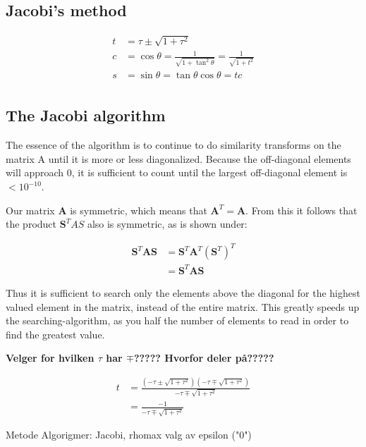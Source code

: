 \subsection{Jacobi's method}

\begin{align*}
t &= \tau \pm \sqrt{1+\tau^2}\\ 
c &= \cos \theta = \frac{1}{\sqrt{1+\tan^2\theta}} = \frac{1}{\sqrt{1+t^2}}\\
s &= \sin \theta = \tan \theta \cos \theta = t c\\
\end{align*}

\subsection{The Jacobi algorithm}

The essence of the algorithm is to continue to do similarity transforms on the matrix A until it is more or less diagonalized. Because the off-diagonal elements will approach $ 0 $, it is sufficient to count until the largest off-diagonal element is $ < 10^{-10} $. 

Our matrix \textbf{A} is symmetric, which means that $ \textbf{A}^T = \textbf{A} $. From this it follows that the product $ \textbf{S}^TAS $ also is symmetric, as is shown under:

\begin{align}
\textbf{S}^T\textbf{AS} &= \textbf{S}^T\textbf{A}^T(\textbf{S}^T)^T\\
&= \textbf{S}^T\textbf{AS} 
\end{align}

Thus  it is sufficient to search only the elements above the diagonal for the highest valued element in the matrix, instead of the entire matrix. This greatly speeds up the searching-algorithm, as you half the number of elements to read in order to find the greatest value. 



\textbf{Velger for hvilken $ \tau $ har $ \mp $?????
Hvorfor deler på?????
}

\begin{align}
t &= \frac{(-\tau \pm \sqrt{1+\tau^2})(-\tau \mp \sqrt{1+ \tau^2})}{-\tau \mp \sqrt{1+\tau^2}}\\
&= \frac{-1}{-\tau \mp \sqrt{1+\tau^2}}
\end{align}

	Metode
Algorigmer: Jacobi, rhomax
valg av epsilon ("0")








